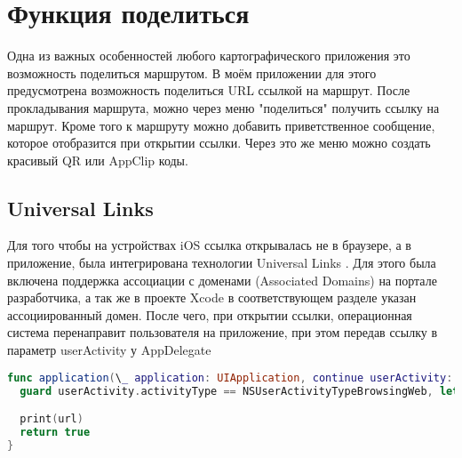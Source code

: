 \chapter{Функция поделиться}
  Одна из важных особенностей любого картографического приложения это возможность поделиться маршрутом. В моём приложении для этого предусмотрена возможность поделиться URL ссылкой на маршрут. После прокладывания маршрута, можно через меню "поделиться" получить ссылку на маршрут. Кроме того к маршруту можно добавить приветственное сообщение, которое отобразится при открытии ссылки. Через это же меню можно создать красивый QR или AppClip коды.

  \section{Universal Links}
    Для того чтобы на устройствах iOS ссылка открывалась не в браузере, а в приложение, была интегрирована технологии Universal Links \cite{UniversalLinks}. Для этого была включена поддержка ассоциации с доменами (Associated Domains) на портале разработчика, а так же в проекте Xcode в соответствующем разделе указан ассоциированный домен. После чего, при открытии ссылки, операционная система перенаправит пользователя на приложение, при этом передав ссылку в параметр userActivity у AppDelegate

    \begin{lstlisting}[language=swift,caption={Получение ссылки из Universal Links}]
func application(\_ application: UIApplication, continue userActivity: NSUserActivity, restorationHandler: [Any?] -> Void) -> Bool {
  guard userActivity.activityType == NSUserActivityTypeBrowsingWeb, let url = userActivity.webpageURL else { return false }

  print(url)
  return true
}
    \end{lstlisting}


